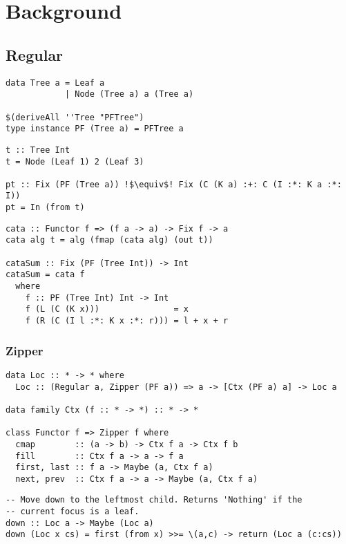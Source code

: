 \section{Background}

\subsection{Regular}

\begin{verbatim}
data Tree a = Leaf a
            | Node (Tree a) a (Tree a)

$(deriveAll ''Tree "PFTree")
type instance PF (Tree a) = PFTree a
\end{verbatim}

\begin{verbatim}
t :: Tree Int
t = Node (Leaf 1) 2 (Leaf 3)

pt :: Fix (PF (Tree a)) !$\equiv$! Fix (C (K a) :+: C (I :*: K a :*: I))
pt = In (from t)
\end{verbatim}

\begin{verbatim}
cata :: Functor f => (f a -> a) -> Fix f -> a
cata alg t = alg (fmap (cata alg) (out t))

cataSum :: Fix (PF (Tree Int)) -> Int
cataSum = cata f
  where
    f :: PF (Tree Int) Int -> Int
    f (L (C (K x)))               = x
    f (R (C (I l :*: K x :*: r))) = l + x + r
\end{verbatim}

\subsubsection{Zipper}
\begin{verbatim}
data Loc :: * -> * where
  Loc :: (Regular a, Zipper (PF a)) => a -> [Ctx (PF a) a] -> Loc a

data family Ctx (f :: * -> *) :: * -> * 

class Functor f => Zipper f where
  cmap        :: (a -> b) -> Ctx f a -> Ctx f b
  fill        :: Ctx f a -> a -> f a
  first, last :: f a -> Maybe (a, Ctx f a)
  next, prev  :: Ctx f a -> a -> Maybe (a, Ctx f a)
\end{verbatim}

\begin{verbatim}
-- Move down to the leftmost child. Returns 'Nothing' if the
-- current focus is a leaf.
down :: Loc a -> Maybe (Loc a)
down (Loc x cs) = first (from x) >>= \(a,c) -> return (Loc a (c:cs))
\end{verbatim}


